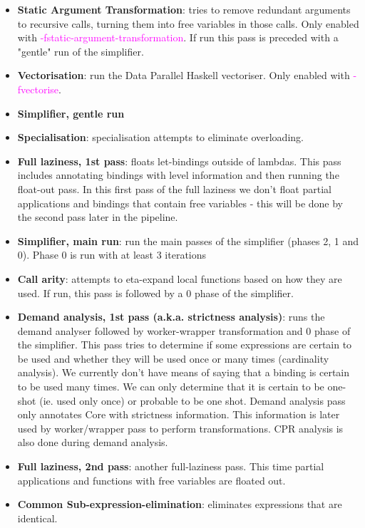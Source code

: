 \documentclass{article}
\begin{document}
	\begin{itemize}
		\item \textbf{Static Argument Transformation}: tries to remove redundant arguments to recursive calls, turning them into free variables in those calls. Only enabled with \textcolor{magenta}{-fstatic-argument-transformation}. If run this pass is preceded with a "gentle" run of the simplifier.
		\item \textbf{Vectorisation}: run the Data Parallel Haskell vectoriser. Only enabled with \textcolor{magenta}{-fvectorise}.
		\item \textbf{Simplifier, gentle run}
		\item \textbf{Specialisation}: specialisation attempts to eliminate overloading.
		\item \textbf{Full laziness, 1st pass}: floats let-bindings outside of lambdas. This pass includes annotating bindings with level information and then running the float-out pass. In this first pass of the full laziness we don't float partial applications and bindings that contain free variables - this will be done by the second pass later in the pipeline.
		\item \textbf{Simplifier, main run}: run the main passes of the simplifier (phases 2, 1 and 0). Phase 0 is run with at least 3 iterations
		\item \textbf{Call arity}: attempts to eta-expand local functions based on how they are used. If run, this pass is followed by a 0 phase of the simplifier.
		\item \textbf{Demand analysis, 1st pass (a.k.a. strictness analysis)}: runs the demand analyser followed by worker-wrapper transformation and 0 phase of the simplifier. This pass tries to determine if some expressions are certain to be used and whether they will be used once or many times (cardinality analysis). We currently don't have means of saying that a binding is certain to be used many times. We can only determine that it is certain to be one-shot (ie. used only once) or probable to be one shot. Demand analysis pass only annotates Core with strictness information. This information is later used by worker/wrapper pass to perform transformations. CPR analysis is also done during demand analysis.
		\item \textbf{Full laziness, 2nd pass}: another full-laziness pass. This time partial applications and functions with free variables are floated out.
		\item \textbf{Common Sub-expression-elimination}: eliminates expressions that are identical.

\end{itemize}
\end{document}

